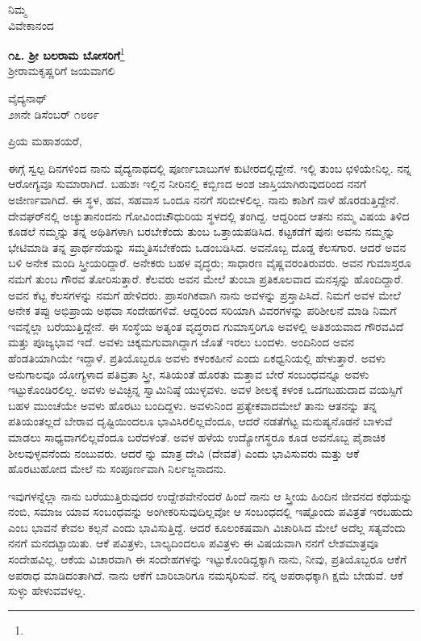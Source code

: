{\flushright
ನಿಮ್ಮ\\ವಿವೇಕಾನಂದ\par}

\begin{center}
\textbf{೧೭. ಶ‍್ರೀ ಬಲರಾಮ ಬೋಸರಿಗೆ}\footnote{}\\ ಶ‍್ರೀರಾಮಕೃಷ್ಣರಿಗೆ ಜಯವಾಗಲಿ
\end{center}

\begin{flushright}
ವೈದ್ಯನಾಥ್\\೨೫ನೇ ಡಿಸೆಂಬರ್‌ ೧೮೮೯
\end{flushright}

\noindent
ಪ್ರಿಯ ಮಹಾಶಯರೆ,

ಈಗ್ಗೆ ಸ್ವಲ್ಪ ದಿನಗಳಿಂದ ನಾನು ವೈದ್ಯನಾಥದಲ್ಲಿ ಪೂರ್ಣಬಾಬುಗಳ ಕುಟೀರದಲ್ಲಿದ್ದೇನೆ. ಇಲ್ಲಿ ತುಂಬ ಛಳಿಯೇನಿಲ್ಲ. ನನ್ನ ಆರೋಗ್ಯವೂ ಸುಮಾರಾಗಿದೆ. ಬಹುಶಃ ಇಲ್ಲಿನ ನೀರಿನಲ್ಲಿ ಕಬ್ಬಿಣದ ಅಂಶ ಜಾಸ್ತಿಯಾಗಿರುವುದರಿಂದ ನನಗೆ ಅಜೀರ್ಣವಾಗಿದೆ. ಈ ಸ್ಥಳ, ಹವ, ಸಹವಾಸ ಒಂದೂ ನನಗೆ ಸರಿಬೀಳಲಿಲ್ಲ. ನಾನು ಕಾಶಿಗೆ ನಾಳೆ ಹೊರಡುತ್ತಿದ್ದೇನೆ. ದೇವಘರ್‌ನಲ್ಲಿ ಅಚ್ಯುತಾನಂದನು ಗೋವಿಂದಚೌಧುರಿಯ ಸ್ಥಳದಲ್ಲಿ ತಂಗಿದ್ದ. ಆದ್ದರಿಂದ ಆತನು ನಮ್ಮ ವಿಷಯ ತಿಳಿದ ಕೂಡಲೆ ನಮ್ಮನ್ನು ತನ್ನ ಅಥಿತಿಗಳಾಗಿ ಬರಬೇಕೆಂದು ತುಂಬ ಒತ್ತಾಯಪಡಿಸಿದ. ಕಟ್ಟಕಡೆಗೆ ಪುನಃ ಅವನು ನಮ್ಮನ್ನು ಭೇಟಿಮಾಡಿ ತನ್ನ ಪ್ರಾರ್ಥನೆಯನ್ನು ಸಮ್ಮತಿಸಬೇಕೆಂದು ಒಡಂಬಡಿಸಿದ. ಅವನೊಬ್ಬ ದೊಡ್ಡ ಕೆಲಸಗಾರ. ಆದರೆ ಅವನ ಬಳಿ ಅನೇಕ ಮಂದಿ ಸ್ತ್ರೀಯರಿದ್ದಾರೆ. ಅನೇಕರು ಬಹಳ ವೃದ್ಧರು; ಸಾಧಾರಣ ವೈಷ್ಣವರಂತಿರುವರು. ಅವನ ಗುಮಾಸ್ತರೂ ನಮಗೆ ತುಂಬ ಗೌರವ ತೋರಿಸುತ್ತಾರೆ. ಕೆಲವರು ಅವನ ಮೇಲೆ ತುಂಬಾ ಪ್ರತಿಕೂಲವಾದ ಮನಸ್ಸನ್ನು ಹೊಂದಿದ್ದಾರೆ. ಅವನ ಕೆಟ್ಟ ಕೆಲಸಗಳನ್ನು ನಮಗೆ ಹೇಳಿದರು. ಪ್ರಾಸಂಗಿಕವಾಗಿ ನಾನು \enginline{-} ಅವಳನ್ನು ಪ್ರಸ್ತಾಪಿಸಿದೆ. ನಿಮಗೆ ಅವಳ ಮೇಲೆ ಅನೇಕ ತಪ್ಪು ಅಭಿಪ್ರಾಯ ಅಥವಾ ಸಂದೇಹಗಳಿವೆ. ಆದ್ದರಿಂದ ಸರಿಯಾಗಿ ವಿವರಗಳನ್ನು ಪರಿಶೀಲನೆ ಮಾಡಿ ನಿಮಗೆ ಇವನ್ನೆಲ್ಲಾ ಬರೆಯುತ್ತಿದ್ದೇನೆ. ಈ ಸಂಸ್ಥೆಯ ಅತ್ಯಂತ ವೃದ್ಧರಾದ ಗುಮಾಸ್ತರಿಗೂ ಅವಳಲ್ಲಿ ಅತಿಶಯವಾದ ಗೌರವವಿದೆ ಮತ್ತು ಪೂಜ್ಯಭಾವ ಇದೆ. ಅವಳು ಚಿಕ್ಕಮಗುವಾಗಿದ್ದಾಗ \enginline{-} ಜೊತೆ ಇರಲು ಬಂದಳು. ಅಂದಿನಿಂದ ಅವನ ಹೆಂಡತಿಯಾಗಿಯೇ ಇದ್ದಾಳೆ. ಪ್ರತಿಯೊಬ್ಬರೂ ಅವಳು ಕಳಂಕಹೀನೆ ಎಂದು ಏಕಧ್ವನಿಯಲ್ಲಿ ಹೇಳುತ್ತಾರೆ. ಅವಳು ಅನುಗಾಲವೂ ಯೋಗ್ಯಳಾದ ಪತಿವ್ರತಾ ಸ್ತ್ರೀ, ಸತಿಯಂತೆ ಹೊರತು ಮತ್ತಾವ ಬೇರೆ ಸಂಬಂಧವನ್ನೂ ಅವಳು ಇಟ್ಟುಕೊಂಡಿರಲಿಲ್ಲ. ಅವಳು ಅವಿಚ್ಛಿನ್ನ ಸ್ವಾಮಿನಿಷ್ಠೆ ಯುಳ್ಳವಳು. ಅವಳ ಶೀಲಕ್ಕೆ ಕಳಂಕ ಒದಗಬಹುದಾದ ವಯಸ್ಸಿಗೆ ಬಹಳ ಮುಂಚೆಯೇ ಅವಳು ಹೊರಟು ಬಂದಿದ್ದಳು. ಅವಳು\enginline{-}ನಿಂದ ಪ್ರತ್ಯೇಕವಾದಮೇಲೆ ತಾನು ಆತನನ್ನು ತನ್ನ ಪತಿಯಂತಲ್ಲದೆ ಬೇರಾವ ದೃಷ್ಟಿಯಿಂದಲೂ ಭಾವಿಸಿರಲಿಲ್ಲವೆಂದೂ, ಆದರೆ ನಡತೆಗೆಟ್ಟ ಮನುಷ್ಯನೊಡನೆ ಬಾಳುವೆ ಮಾಡಲು ಸಾಧ್ಯವಾಗಲಿಲ್ಲವೆಂದೂ ಬರೆದಳಂತೆ. ಅವಳ ಹಳೆಯ ಉದ್ಯೋಗಸ್ಥರೂ ಕೂಡ ಅವನೊಬ್ಬ ಪೈಶಾಚಿಕ ಶೀಲವುಳ್ಳವನೆಂದು ನಂಬುವರು. ಆದರೆ \enginline{-} ನ್ನು ಮಾತ್ರ ದೇವಿ (ದೇವತೆ) ಎಂದು ಭಾವಿಸುವರು ಮತ್ತು ಆಕೆ ಹೊರಟುಹೋದ ಮೇಲೆ \enginline{-} ನು ಸಂಪೂರ್ಣವಾಗಿ ನಿರ್ಲಜ್ಜನಾದನು.

ಇವುಗಳನ್ನೆಲ್ಲಾ ನಾನು ಬರೆಯುತ್ತಿರುವುದರ ಉದ್ದೇಶವೇನೆಂದರೆ ಹಿಂದೆ ನಾನು ಆ ಸ್ತ್ರೀಯ ಹಿಂದಿನ ಜೀವನದ ಕಥೆಯನ್ನು ನಂಬಿ, ಸಮಾಜ ಯಾವ ಸಂಬಂಧವನ್ನು ಅಂಗೀಕರಿಸುವುದಿಲ್ಲವೋ ಆ ಸಂಬಂಧದಲ್ಲಿ ಇಷ್ಟೊಂದು ಪವಿತ್ರತೆ ಇರಬಹುದು ಎಂಬ ಭಾವನೆ ಕೇವಲ ಕಲ್ಪನೆ ಎಂದು ಭಾವಿಸುತ್ತಿದ್ದೆ. ಆದರೆ ಕೂಲಂಕಷವಾಗಿ ವಿಚಾರಿಸಿದ ಮೇಲೆ ಅದೆಲ್ಲ ಸತ್ಯವೆಂದು ನನಗೆ ಮನದಟ್ಟಾಯಿತು. ಆಕೆ ಪವಿತ್ರಳು, ಬಾಲ್ಯದಿಂದಲೂ ಪವಿತ್ರಳು \enginline{-} ಈ ವಿಷಯವಾಗಿ ನನಗೆ ಲೇಶಮಾತ್ರವೂ ಸಂದೇಹವಿಲ್ಲ. ಆಕೆಯ ವಿಚಾರವಾಗಿ ಈ ಸಂದೇಹಗಳನ್ನು ಇಟ್ಟುಕೊಂಡಿದ್ದಕ್ಕಾಗಿ ನಾನು, ನೀವು, ಪ್ರತಿಯೊಬ್ಬರೂ ಆಕೆಗೆ ಅಪರಾಧ ಮಾಡಿದಂತಾಗಿದೆ. ನಾನು ಆಕೆಗೆ ಬಾರಿಬಾರಿಗೂ ನಮಸ್ಕರಿಸುವೆ. ನನ್ನ ಅಪರಾಧಕ್ಕಾಗಿ ಕ್ಷಮೆ ಬೇಡುವೆ. ಆಕೆ ಸುಳ್ಳು ಹೇಳುವವಳಲ್ಲ.

